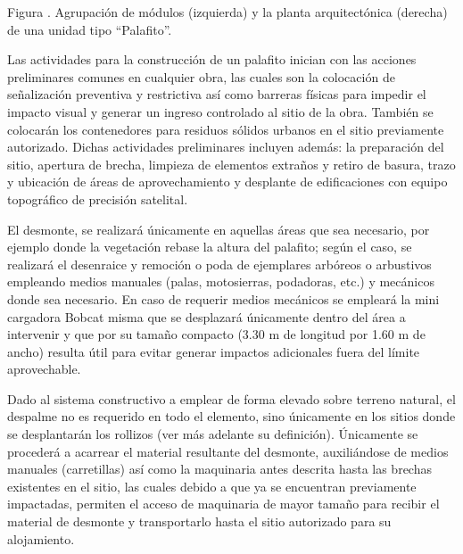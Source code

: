 \documentclass{article}
\newcounter{Figura}
\renewcommand\theFigura{\arabic{Figura}}
\begin{document}
\bigskip

Figura \stepcounter{Figura}{\theFigura}. Agrupación de módulos (izquierda) y la planta arquitectónica (derecha) de una unidad tipo “Palafito”.


\bigskip


\bigskip

Las actividades para la construcción de un palafito inician con las acciones preliminares comunes en cualquier obra, las cuales son la colocación de señalización preventiva y restrictiva así como barreras físicas para impedir el impacto visual y generar un ingreso controlado al sitio de la obra. También se colocarán los contenedores para residuos sólidos urbanos en el sitio previamente autorizado. Dichas actividades preliminares incluyen además: la preparación del sitio, apertura de brecha, limpieza de elementos extraños y retiro de basura, trazo y ubicación de áreas de aprovechamiento y desplante de edificaciones con equipo topográfico de precisión satelital. 


\bigskip

El desmonte, se realizará únicamente en aquellas áreas que sea necesario, por ejemplo donde la vegetación rebase la altura del palafito; según el caso, se realizará el desenraice y remoción o poda de ejemplares arbóreos o arbustivos empleando medios manuales (palas, motosierras, podadoras, etc.) y mecánicos donde sea necesario. En caso de requerir medios mecánicos se empleará la mini cargadora Bobcat misma que se desplazará únicamente dentro del área a intervenir y que por su tamaño compacto (3.30 m de longitud por 1.60 m de ancho) resulta útil para evitar generar impactos adicionales fuera del límite aprovechable.


\bigskip

Dado al sistema constructivo a emplear de forma elevado sobre terreno natural, el despalme no es requerido en todo el elemento, sino únicamente en los sitios donde se desplantarán los rollizos (ver más adelante su definición). Únicamente se procederá a acarrear el material resultante del desmonte, auxiliándose de medios manuales (carretillas) así como la maquinaria antes descrita hasta las brechas existentes en el sitio, las cuales debido a que ya se encuentran previamente impactadas, permiten el acceso de maquinaria de mayor tamaño para recibir el material de desmonte y transportarlo hasta el sitio autorizado para su alojamiento.


\bigskip
\end{document}
